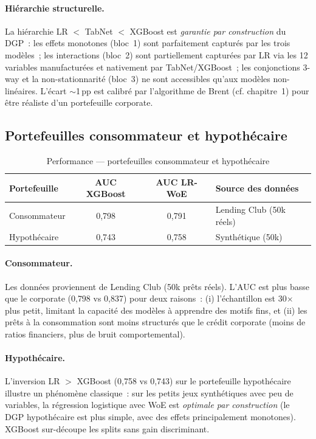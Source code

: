 \documentclass[12pt, a4paper, twoside, openright]{report}
\theoremstyle{definition}
\begin{document}
\paragraph{Hiérarchie structurelle.} La hiérarchie LR $<$ TabNet $<$ XGBoost est \emph{garantie par construction} du DGP~: les effets monotones (bloc~1) sont parfaitement capturés par les trois modèles~; les interactions (bloc~2) sont partiellement capturées par LR via les 12 variables manufacturées et nativement par TabNet/XGBoost~; les conjonctions 3-way et la non-stationnarité (bloc~3) ne sont accessibles qu'aux modèles non-linéaires. L'écart $\sim$1\,pp est calibré par l'algorithme de Brent (cf. chapitre~1) pour être réaliste d'un portefeuille corporate.

\subsection{Portefeuilles consommateur et hypothécaire}

\begin{table}[htbp]
\centering
\caption{Performance --- portefeuilles consommateur et hypothécaire}
\label{tab:resultats-consumer-mortgage}
\begin{tabular}{lccl}
\toprule
Portefeuille & AUC XGBoost & AUC LR-WoE & Source des données \\
\midrule
Consommateur & 0{,}798 & 0{,}791 & Lending Club (50k réels) \\
Hypothécaire & 0{,}743 & 0{,}758 & Synthétique (50k) \\
\bottomrule
\end{tabular}
\end{table}

\paragraph{Consommateur.} Les données proviennent de Lending Club (50k prêts réels). L'AUC est plus basse que le corporate (0{,}798 vs 0{,}837) pour deux raisons~: (i) l'échantillon est 30$\times$ plus petit, limitant la capacité des modèles à apprendre des motifs fins, et (ii) les prêts à la consommation sont moins structurés que le crédit corporate (moins de ratios financiers, plus de bruit comportemental).

\paragraph{Hypothécaire.} L'inversion LR $>$ XGBoost (0{,}758 vs 0{,}743) sur le portefeuille hypothécaire illustre un phénomène classique~: sur les petits jeux synthétiques avec peu de variables, la régression logistique avec WoE est \emph{optimale par construction} (le DGP hypothécaire est plus simple, avec des effets principalement monotones). XGBoost sur-découpe les splits sans gain discriminant.
\end{document}
